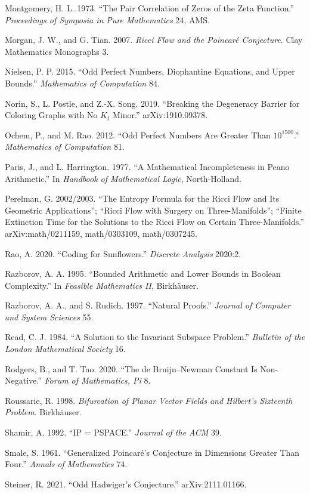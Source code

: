 \documentclass[10pt]{article}
\renewcommand{\_}{\origunderscore\allowbreak}
\begin{document}
Montgomery, H. L. 1973. ``The Pair Correlation of Zeros of the Zeta
Function.'' \emph{Proceedings of Symposia in Pure Mathematics} 24, AMS.

Morgan, J. W., and G. Tian. 2007. \emph{Ricci Flow and the Poincaré
Conjecture}. Clay Mathematics Monographs 3.

Nielsen, P. P. 2015. ``Odd Perfect Numbers, Diophantine Equations, and
Upper Bounds.'' \emph{Mathematics of Computation} 84.

Norin, S., L. Postle, and Z.-X. Song. 2019. ``Breaking the Degeneracy
Barrier for Coloring Graphs with No \(K_t\) Minor.'' arXiv:1910.09378.

Ochem, P., and M. Rao. 2012. ``Odd Perfect Numbers Are Greater Than
\(10^{1500}\).'' \emph{Mathematics of Computation} 81.

Paris, J., and L. Harrington. 1977. ``A Mathematical Incompleteness in
Peano Arithmetic.'' In \emph{Handbook of Mathematical Logic},
North-Holland.

Perelman, G. 2002/2003. ``The Entropy Formula for the Ricci Flow and Its
Geometric Applications''; ``Ricci Flow with Surgery on
Three-Manifolds''; ``Finite Extinction Time for the Solutions to the
Ricci Flow on Certain Three-Manifolds.'' arXiv:math/0211159,
math/0303109, math/0307245.

Rao, A. 2020. ``Coding for Sunflowers.'' \emph{Discrete Analysis}
2020:2.

Razborov, A. A. 1995. ``Bounded Arithmetic and Lower Bounds in Boolean
Complexity.'' In \emph{Feasible Mathematics II}, Birkhäuser.

Razborov, A. A., and S. Rudich. 1997. ``Natural Proofs.'' \emph{Journal
of Computer and System Sciences} 55.

Read, C. J. 1984. ``A Solution to the Invariant Subspace Problem.''
\emph{Bulletin of the London Mathematical Society} 16.

Rodgers, B., and T. Tao. 2020. ``The de Bruijn--Newman Constant Is
Non-Negative.'' \emph{Forum of Mathematics, Pi} 8.

Roussarie, R. 1998. \emph{Bifurcation of Planar Vector Fields and
Hilbert's Sixteenth Problem}. Birkhäuser.

Shamir, A. 1992. ``IP = PSPACE.'' \emph{Journal of the ACM} 39.

Smale, S. 1961. ``Generalized Poincaré's Conjecture in Dimensions
Greater Than Four.'' \emph{Annals of Mathematics} 74.

Steiner, R. 2021. ``Odd Hadwiger's Conjecture.'' arXiv:2111.01166.
\end{document}
